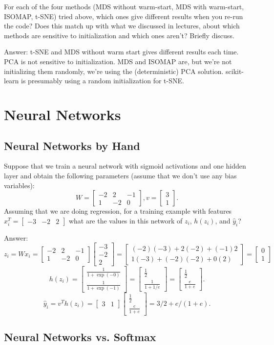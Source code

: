 \documentclass{article}
\def\ans#1{\par\gre{Answer: #1}}
\def\answer#1{\ans{#1}}
\def\blu#1{{\color{blu}#1}}
\def\gre#1{{\color{gre}#1}}
\newcommand{\mat}[1]{\begin{bmatrix}#1\end{bmatrix}}
\def\half{\frac 1 2}
\begin{document}
For each of the four methods (MDS without warm-start, MDS with warm-start, ISOMAP, t-SNE) tried above, which ones give different results when you re-run the code? Does this match up with what we discussed in lectures, about which methods are sensitive to initialization and which ones aren't? Briefly discuss.

\answer{t-SNE and MDS without warm start gives different results each time. PCA is not sensitive to initialization. MDS and ISOMAP are, but we're not initializing them randomly, we're using the (deterministic) PCA solution. scikit-learn is presumably using a random initialization for t-SNE.}

\section{Neural Networks}

\subsection{Neural Networks by Hand}

Suppose that we train a neural network with sigmoid activations and one hidden layer and obtain the following parameters (assume that we don't use any bias variables):
\[
W = \mat{-2 & 2 & -1\\1 & -2 & 0}, v = \mat{3 \\1}.
\]
Assuming that we are doing regression, \blu{for a training example with features $x_i^T = \mat{-3 &-2 & 2}$ what are the values in this network of $z_i$, $h(z_i)$, and $\hat{y}_i$?}
\ans{
\[
z_i = Wx_i = \mat{-2 & 2 & -1\\1 & -2 & 0}\mat{-3 \\ -2 \\ 2} = \mat{(-2)(-3) + 2(-2) + (-1)2\\1(-3) + (-2)(-2) + 0(2)} = \mat{0\\1} 
\]
\[
h(z_i) = \mat{\frac{1}{1+\exp(-0)}\\\frac{1}{1+\exp(-1)}} = \mat{\half\\\frac{1}{1+1/e}} =  \mat{\half\\\frac{e}{1+e}}.
\]
\[
\hat{y}_i = v^Th(z_i) = \mat{3 & 1}\mat{\half\\\frac{e}{1+e}} = 3/2 + e/(1+e).
\]
}

\subsection{Neural Networks vs. Softmax}
\end{document}

